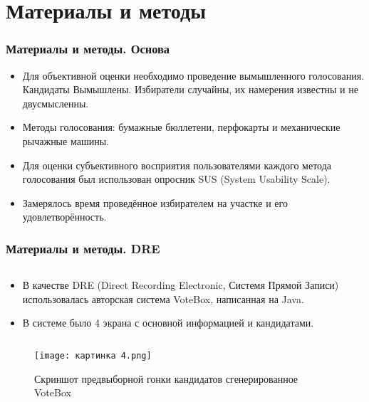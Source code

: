 \documentclass[11pt]{beamer}
\begin{document}
\section{Материалы и методы}

\begin{frame}
\frametitle{Материалы и методы. Основа}
    
    \begin{minipage}[h]{0.8\linewidth}  
        \begin{itemize}
        \item \small Для объективной оценки необходимо проведение вымышленного голосования. Кандидаты Вымышлены. Избиратели случайны, их намерения известны и не двусмысленны.
        
        \item \small Методы голосования: бумажные бюллетени, перфокарты и механические рычажные машины.

        \item \small Для оценки субъективного восприятия пользователями каждого метода голосования был использован опросник SUS (System Usability Scale).

        \item \small Замерялось время проведённое избирателем на участке и его удовлетворённость.
        \end{itemize}
    \end{minipage}

\end{frame}

\begin{frame}
\frametitle{Материалы и методы. DRE}
    \begin{column}[h]{0.45\linewidth}  
        \begin{itemize}
        \item \small В качестве DRE (Direct Recording Electronic, Системя Прямой Записи) использовалась авторская система \alert{VoteBox}, написанная на Java. \newline
        
        \item \small В системе было 4 экрана с основной информацией и кандидатами.
        \end{itemize}
    \end{column}
    \begin{column}[h]{0.5\linewidth}
        \begin{figure}
            \texttt{[image: картинка 4.png]}
            \caption{\footnotesize Скриншот предвыборной гонки кандидатов сгенерированное VoteBox}
        \end{figure}
    \end{column}
\end{frame}
\end{document}
